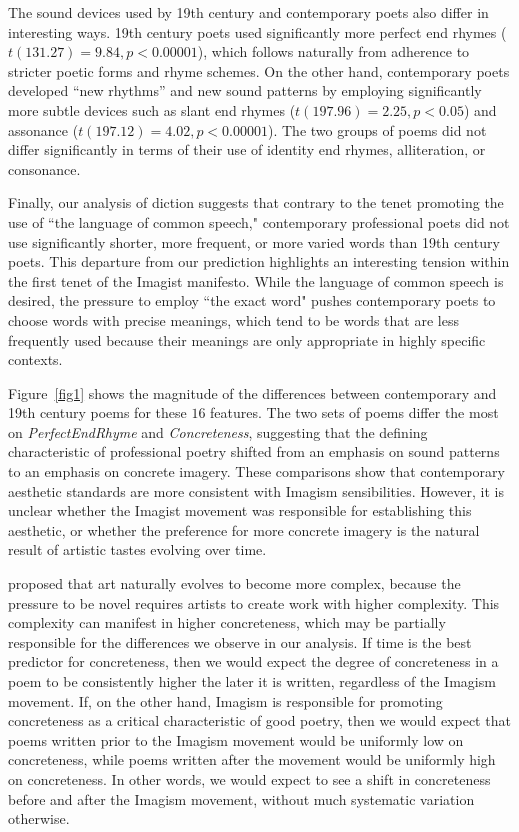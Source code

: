 \documentclass{book}
\begin{document}
The sound devices used by 19th century and contemporary poets also differ in interesting ways. 19th century poets used significantly more perfect end rhymes ($t(131.27) = 9.84, p < 0.00001$), which follows naturally from adherence to stricter poetic forms and rhyme schemes. On the other hand, contemporary poets developed ``new rhythms'' and new sound patterns by employing significantly more subtle devices such as slant end rhymes ($t(197.96) = 2.25, p < 0.05$) and assonance ($t(197.12) = 4.02, p <  0.00001$). The two groups of poems did not differ significantly in terms of their use of identity end rhymes, alliteration, or consonance.

Finally, our analysis of diction suggests that contrary to the tenet promoting the use of ``the language of common speech," contemporary professional poets did not use significantly shorter, more frequent, or more varied words than 19th century poets. This departure from our prediction highlights an interesting tension within the first tenet of the Imagist manifesto. While the language of common speech is desired, the pressure to employ ``the exact word" pushes contemporary poets to choose words with precise meanings, which tend to be words that are less frequently used because their meanings are only appropriate in highly specific contexts. 

Figure~\ref{fig1} shows the magnitude of the differences  between contemporary and 19th century poems for these $16$ features. The two sets of poems differ the most on \emph{PerfectEndRhyme} and \emph{Concreteness}, suggesting that the defining characteristic of professional poetry shifted from an emphasis on sound patterns to an emphasis on concrete imagery. These comparisons show that contemporary aesthetic standards are more consistent with Imagism sensibilities. However, it is unclear whether the Imagist movement was responsible for establishing this aesthetic, or whether the preference for more concrete imagery is the natural result of artistic tastes evolving over time. 

\cite{martindale1990clockwork} proposed that art naturally evolves to become more complex, because the pressure to be novel requires artists to create work with higher complexity. %
This complexity can manifest in higher concreteness, which may be partially responsible for the differences we observe in our analysis. If time is the best predictor for concreteness, then we would expect the degree of concreteness in a poem to be consistently higher the later it is written, regardless of the Imagism movement. If, on the other hand, Imagism is responsible for promoting concreteness as a critical characteristic of good poetry, then we would expect that poems written prior to the Imagism movement would be uniformly low on concreteness, while poems written after the movement would be uniformly high on concreteness. In other words, we would expect to see a shift in concreteness before and after the Imagism movement, without much systematic variation otherwise.
\end{document}

